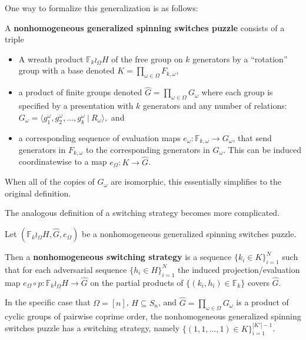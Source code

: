 One way to formalize this generalization is as follows:
\begin{definition}
  A \textbf{nonhomogeneous generalized spinning switches puzzle}
  consists of a triple \begin{itemize}
    \item A wreath product \(
      \mathbb F_k \wr_\Omega H
    \) of the free group on $k$ generators by a ``rotation'' group
    with a base denoted \(K = \prod_{\omega \in \Omega} F_{k, \omega}\),
    \item a product of finite groups denoted
    $\hat G = \prod_{\omega \in \Omega} G_\omega$ where each group is specified
    by a presentation with $k$ generators and any number of relations:
    \({
      G_\omega = \langle g^\omega_1, g^\omega_2, \dots, g^\omega_k\ |\ R_\omega\rangle,
    }\) and
    \item a corresponding sequence of evaluation maps
    $e_\omega \colon \mathbb F_{k,\omega} \rightarrow G_\omega$,
    that send generators in $F_{k,\omega}$ to the corresponding generators in
    $G_\omega$. This can be induced coordinatewise to a map
    $e_\Omega \colon K \rightarrow \hat{G}$.
  \end{itemize}
\end{definition}

When all of the copies of $G_\omega$ are isomorphic, this essentially simplifies
to the original definition.

The analogous definition of a switching strategy becomes more complicated.

\begin{definition}
  Let $(\mathbb F_k \wr_\Omega H, \hat{G}, e_\Omega)$ be a nonhomogeneous
  generalized spinning switches puzzle.

  Then a \textbf{nonhomogeneous switching strategy} is a sequence
  $\{k_i \in K\}_{i=1}^{N}$
  such that for each adversarial sequence ${\{h_i \in H\}_{i=1}^{N}}$
  the induced projection/evaluation map
  $e_\Omega \circ p \colon \mathbb F_k \wr_\Omega H \rightarrow \hat{G}$
  on the partial products of $\{(k_i, h_i) \in \mathbb F_k\}$
  covers $\hat{G}$.
\end{definition}

\begin{proposition}
  In the specific case that $\Omega = [n]$, $H \subseteq S_n$, and
  $\hat{G} = \prod_{\omega \in \Omega} G_\omega$ is a product of cyclic groups of
  pairwise coprime order,
  the nonhomogeneous generalized spinning switches puzzle has a switching
  strategy, namely $\{(1,1,\dots,1) \in K\}_{i = 1}^{|K'| - 1}$.
\end{proposition}

